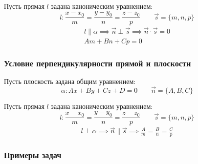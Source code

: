 Пусть прямая $l$ задана каноническим уравнением:  \[
  l: \frac{x - x_0}{m} = \frac{y - y_0}{n} = \frac{z - z_0}{p} \qquad \vec{s} = \{m, n, p\} 
\] 
\begin{gather*}
  l \parallel \alpha \implies \vec{n} \perp \vec{s} \implies \vec{n} \cdot \vec{s} = 0 \\
  \boxed{Am + Bn + Cp = 0}
\end{gather*}

\subsubsection{Условие перпендикулярности прямой и плоскости}

Пусть плоскость задана общим уравнением: \[
  \alpha: Ax + By + Cz + D = 0 \qquad \vec{n} = \{A, B, C\} 
\] 

Пусть прямая $l$ задана каноническим уравнением:  \[
  l: \frac{x - x_0}{m} = \frac{y - y_0}{n} = \frac{z - z_0}{p} \qquad \vec{s} = \{m, n, p\} 
\] 
\begin{gather*}
  l \perp \alpha \implies \vec{n} \parallel \vec{s} \implies
  \boxed{\frac{A}{m} = \frac{B}{n} = \frac{C}{p}}
\end{gather*}

\subsubsection{Примеры задач}

